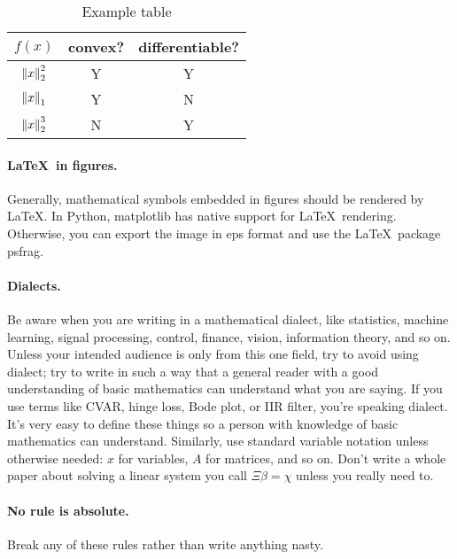 \documentclass{article}
\begin{document}
\begin{table}
    \begin{minipage}{\textwidth}
        \centering
        \begin{tabular}{|c|c|c|}
            \hline
            $f(x)$      & convex? & differentiable? \\ \hline
            ${\lVert x \rVert}_2^2$ & Y       & Y \\
            ${\lVert x \rVert}_1$   & Y       & N \\
            ${\lVert x \rVert}_2^3$ & N       & Y \\
            \hline
        \end{tabular}
        \caption{Example table}
        \label{t-ex1}
    \end{minipage} 
\end{table}

\paragraph{\LaTeX\ in figures.}
Generally, mathematical symbols embedded in figures should be rendered by \LaTeX. 
In Python, matplotlib has native support for \LaTeX\ rendering.
Otherwise, you can export the image in eps format and use the \LaTeX\ package psfrag. 

\paragraph{Dialects.}
Be aware when you are writing in a mathematical dialect, like statistics, machine learning, signal processing, control, finance, vision, information theory, and so on. 
Unless your intended audience is only from this one field, try to avoid using dialect; try to write in such a way that a general reader with a good understanding of basic mathematics can understand what you are saying. 
If you use terms like CVAR, hinge loss, Bode plot, or IIR filter, you're speaking dialect. 
It's very easy to define these things so a person with knowledge of basic mathematics can understand. 
Similarly, use standard variable notation unless otherwise needed: $x$ for variables, $A$ for matrices, and so on. 
Don't write a whole paper about solving a linear system you call $\Xi \beta = \chi$ unless you really need to.

\paragraph{No rule is absolute.}
Break any of these rules rather than write anything nasty.
\end{document}
